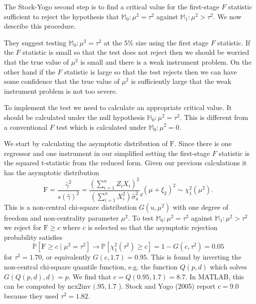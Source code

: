 \documentclass[10pt]{article}
\begin{document}
The Stock-Yogo second step is to find a critical value for the first-stage $F$ statistic sufficient to reject the hypothesis that $\mathbb{M}_{0}: \mu^{2}=\tau^{2}$ against $\mathbb{M}_{1}: \mu^{2}>\tau^{2}$. We now describe this procedure.

They suggest testing $\mathbb{M}_{0}: \mu^{2}=\tau^{2}$ at the $5 \%$ size using the first stage $F$ statistic. If the $F$ statistic is small so that the test does not reject then we should be worried that the true value of $\mu^{2}$ is small and there is a weak instrument problem. On the other hand if the $F$ statistic is large so that the test rejects then we can have some confidence that the true value of $\mu^{2}$ is sufficiently large that the weak instrument problem is not too severe.

To implement the test we need to calculate an appropriate critical value. It should be calculated under the null hypothesis $\mathbb{H}_{0}: \mu^{2}=\tau^{2}$. This is different from a conventional $F$ test which is calculated under $\mathbb{M}_{0}: \mu^{2}=0$.

We start by calculating the asymptotic distribution of $\mathrm{F}$. Since there is one regressor and one instrument in our simplified setting the first-stage $F$ statistic is the squared t-statistic from the reduced form. Given our previous calculations it has the asymptotic distribution
$$
\mathrm{F}=\frac{\widehat{\gamma}^{2}}{s(\widehat{\gamma})^{2}}=\frac{\left(\sum_{i=1}^{n} Z_{i} X_{i}\right)^{2}}{\left(\sum_{i=1}^{n} X_{i}^{2}\right) \widehat{\sigma}_{u}^{2}} \underset{d}{ }\left(\mu+\xi_{2}\right)^{2} \sim \chi_{1}^{2}\left(\mu^{2}\right) .
$$
This is a non-central chi-square distribution $G\left(u, \mu^{2}\right)$ with one degree of freedom and non-centrality parameter $\mu^{2}$. To test $\mathbb{M}_{0}: \mu^{2}=\tau^{2}$ against $\mathbb{M}_{1}: \mu^{2}>\tau^{2}$ we reject for $\mathrm{F} \geq c$ where $c$ is selected so that the asymptotic rejection probability satisfies
$$
\mathbb{P}\left[\mathrm{F} \geq c \mid \mu^{2}=\tau^{2}\right] \rightarrow \mathbb{P}\left[\chi_{1}^{2}\left(\tau^{2}\right) \geq c\right]=1-G\left(c, \tau^{2}\right)=0.05
$$
for $\tau^{2}=1.70$, or equivalently $G(c, 1.7)=0.95$. This is found by inverting the non-central chi-square quantile function, e.g. the function $Q(p, d)$ which solves $G(Q(p, d), d)=p$. We find that $c=Q(0.95,1.7)=8.7$. In MATLAB, this can be computed by ncx2inv $(.95,1.7$ ). Stock and Yogo (2005) report $c=9.0$ because they used $\tau^{2}=1.82$.
\end{document}
